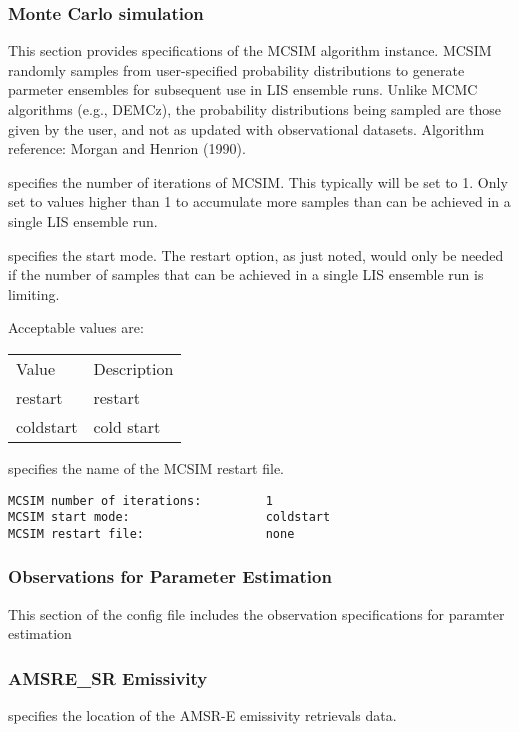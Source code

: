  
 \subsubsection{Monte Carlo simulation} \label{ssec:mcsim}
 This section provides specifications of the MCSIM algorithm instance.
 MCSIM randomly samples from user-specified probability distributions
 to generate parmeter ensembles for subsequent use in  LIS ensemble runs.
 Unlike MCMC algorithms (e.g., DEMCz), the probability distributions being sampled
 are those given by the user, and not as updated with observational datasets.
 Algorithm reference: Morgan and Henrion (1990).
 

 
 
  specifies the 
 number of iterations of MCSIM.  This typically will be
 set to 1.  Only set to values higher than 1 to accumulate more samples
 than can be achieved in a single LIS ensemble run.

  specifies the start mode.  The restart option, as just noted,
 would only be needed if the number of samples that can be achieved in a single LIS ensemble run is limiting.
 
 Acceptable values are:
 \begin{tabular}{ll}
 Value     & Description \\
 restart   & restart     \\
 coldstart & cold start  \\
 \end{tabular}

  specifies the name of the 
 MCSIM restart file.
 

 \begin{Verbatim}[frame=single]
MCSIM number of iterations:         1
MCSIM start mode:                   coldstart 
MCSIM restart file:                 none
 \end{Verbatim}

 
 \subsubsection{Observations for Parameter Estimation} \label{ssec:peobs}
 This section of the config file includes the observation specifications
 for paramter estimation
 



 
 \subsubsection{AMSRE\_SR Emissivity}
 \label{sssec:amsresremobs}
  specifies the location
 of the AMSR-E emissivity retrievals data.

